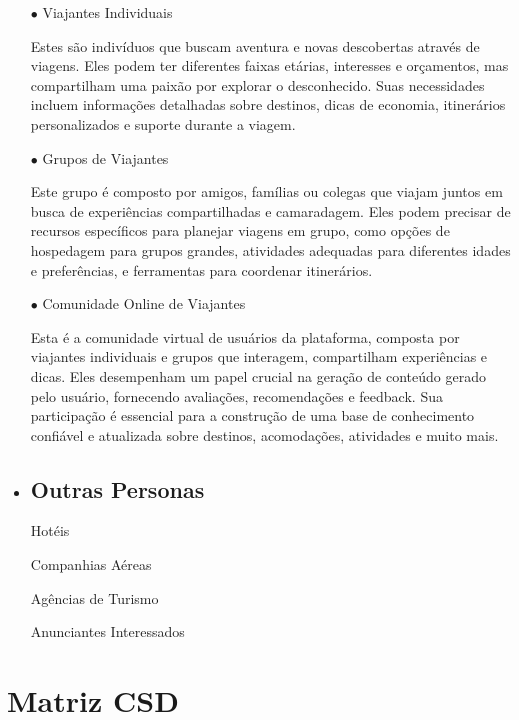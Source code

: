 \documentclass{article}
\begin{document}
\begin{itemize}
      \item[$\bullet$] Viajantes Individuais
      \item[] Estes são indivíduos que buscam aventura e novas descobertas através de viagens.
            Eles podem ter diferentes faixas etárias, interesses e orçamentos, mas compartilham uma paixão por explorar o desconhecido.
            Suas necessidades incluem informações detalhadas sobre destinos, dicas de economia, itinerários personalizados e suporte durante a viagem.
      \item[$\bullet$] Grupos de Viajantes
      \item[] Este grupo é composto por amigos, famílias ou colegas que viajam juntos em busca de experiências compartilhadas e camaradagem.
            Eles podem precisar de recursos específicos para planejar viagens em grupo, como opções de hospedagem para grupos grandes, atividades adequadas para diferentes idades e preferências, e ferramentas para coordenar itinerários.
      \item[$\bullet$] Comunidade Online de Viajantes
      \item[] Esta é a comunidade virtual de usuários da plataforma, composta por viajantes individuais e grupos que interagem, compartilham experiências e dicas.
            Eles desempenham um papel crucial na geração de conteúdo gerado pelo usuário, fornecendo avaliações, recomendações e feedback.
            Sua participação é essencial para a construção de uma base de conhecimento confiável e atualizada sobre destinos, acomodações, atividades e muito mais.
            \vspace{\baselineskip}
            \vspace{\baselineskip}
      \item {\subsection {Outras Personas}}
      \item[] Hotéis
      \item[] Companhias Aéreas
      \item[] Agências de Turismo
      \item[] Anunciantes Interessados
\end{itemize}

\section{Matriz CSD}
\end{document}
